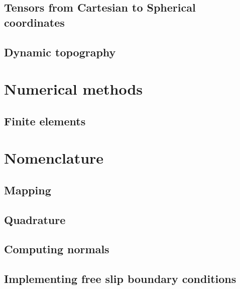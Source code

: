 \documentclass[a4paper,12pt]{article}
\begin{document}
\subsection{Tensors from Cartesian to Spherical coordinates}


\subsection{Dynamic topography}



\newpage
\section{Numerical methods}

\subsection{Finite elements}


\section{Nomenclature}


\subsection{Mapping}


\subsection{Quadrature}

\subsection{Computing normals}


\subsection{Implementing free slip boundary conditions}

\end{document}

